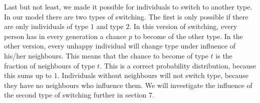 Last but not least, we made it possible for individuals to switch to another type.
In our model there are two types of switching.
The first is only possible if there are only individuals of type $1$ and type $2$.
In this version of switching, every person has in every generation a chance $p$ to become of the other type.
In the other version, every unhappy individual will change type under influence of his/her neighbours.
This means that the chance to become of type $t$ is the fraction of neighbours of type $t$.
This is a correct probability distribution, because this sums up to $1$.
Individuals without neighbours will not switch type, because they have no neighbours who influence them.
We will investigate the influence of the second type of switching further in section $7$.





 







